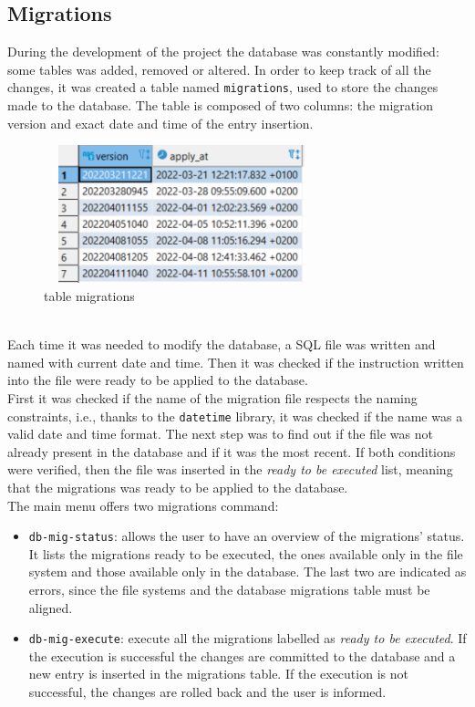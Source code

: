 \documentclass[12pt, a4paper, oneside]{article}
\begin{document}
\subsection{Migrations}
During the development of the project the database was constantly modified: some tables was added, removed or altered. In order to keep track of all the changes, it was created a table named \texttt{migrations},
used to store the changes made to the database. The table is composed of two columns: the migration version and exact date and time of the entry insertion. 
\begin{figure}[h]
    \centering
    \includegraphics[width=8cm, height=4cm]{table-migrations.png}
    \caption{table migrations}
\end{figure}\\
Each time it was needed to modify the database, a SQL file was written and named with current date and time. Then it was checked if the instruction written into the file were ready to be applied to the 
database.\\
First it was checked if the name of the migration file respects the naming constraints, i.e., thanks to the \texttt{datetime} library, it was checked if the name was a valid date and time format.
The next step was to find out if the file was not already present in the database and if it was the most recent. If both conditions were verified, then the file was inserted in the \emph{ready to be executed}
list, meaning that the migrations was ready to be applied to the database.\\
The main menu offers two migrations command:
\begin{itemize}
    \item \texttt{db-mig-status}: allows the user to have an overview of the migrations' status. It lists the migrations ready to be executed, the ones available only in the file system and those available
            only in the database. The last two are indicated as errors, since the file systems and the database migrations table must be aligned.
    \newpage
    \item \texttt{db-mig-execute}: execute all the migrations labelled as \emph{ready to be executed}. If the execution is successful the changes are committed to the database and a new entry is inserted in the
            migrations table. If the execution is not successful, the changes are rolled back and the user is informed.
\end{itemize}
\end{document}
